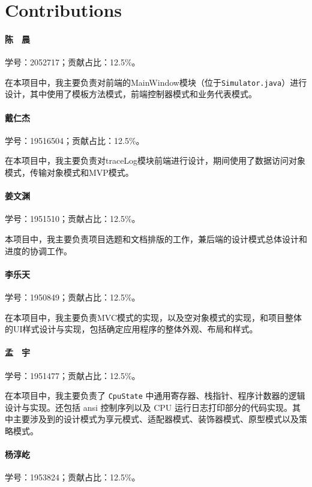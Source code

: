 \newpage
\section*{Contributions}

\paragraph*{陈　晨} 学号：2052717；贡献占比：12.5\%。

在本项目中，我主要负责对前端的MainWindow模块（位于\lstinline{Simulator.java}）进行设计，其中使用了模板方法模式，前端控制器模式和业务代表模式。

\paragraph*{戴仁杰} 学号：19516504；贡献占比：12.5\%。

在本项目中，我主要负责对traceLog模块前端进行设计，期间使用了数据访问对象模式，传输对象模式和MVP模式。

\paragraph*{姜文渊} 学号：1951510；贡献占比：12.5\%。

本项目中，我主要负责项目选题和文档排版的工作，兼后端的设计模式总体设计和进度的协调工作。

\paragraph*{李乐天} 学号：1950849；贡献占比：12.5\%。

在本项目中，我主要负责MVC模式的实现，以及空对象模式的实现，和项目整体的UI样式设计与实现，包括确定应用程序的整体外观、布局和样式。

\paragraph*{孟　宇} 学号：1951477；贡献占比：12.5\%。

​在本项目中，我主要负责了 \lstinline{CpuState} 中通用寄存器、栈指针、程序计数器的逻辑设计与实现。还包括 ansi 控制序列以及 CPU 运行日志打印部分的代码实现。其中主要涉及到的设计模式为享元模式、适配器模式、装饰器模式、原型模式以及策略模式。

\paragraph*{杨淳屹} 学号：1953824；贡献占比：12.5\%。

